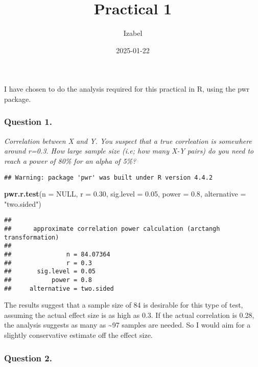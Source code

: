 \documentclass[
]{article}
\title{Practical 1}
\author{Izabel}
\date{2025-01-22}
\newenvironment{Shaded}{\begin{snugshade}}{\end{snugshade}}
\newcommand{\AttributeTok}[1]{\textcolor[rgb]{0.13,0.29,0.53}{#1}}
\newcommand{\ConstantTok}[1]{\textcolor[rgb]{0.56,0.35,0.01}{#1}}
\newcommand{\FloatTok}[1]{\textcolor[rgb]{0.00,0.00,0.81}{#1}}
\newcommand{\FunctionTok}[1]{\textcolor[rgb]{0.13,0.29,0.53}{\textbf{#1}}}
\newcommand{\NormalTok}[1]{#1}
\newcommand{\StringTok}[1]{\textcolor[rgb]{0.31,0.60,0.02}{#1}}
\begin{document}
\maketitle

I have chosen to do the analysis required for this practical in R, using
the pwr package.

\subsubsection{Question 1.}\label{question-1.}

\emph{Correlation between X and Y. You suspect that a true corrleation
is somewhere around r=0.3. How large sample size (i.e; how many X-Y
pairs) do you need to reach a power of 80\% for an alpha of 5\%?}

\begin{verbatim}
## Warning: package 'pwr' was built under R version 4.4.2
\end{verbatim}

\begin{Shaded}
\begin{Highlighting}[]
\FunctionTok{pwr.r.test}\NormalTok{(}\AttributeTok{n =} \ConstantTok{NULL}\NormalTok{, }\AttributeTok{r =} \FloatTok{0.30}\NormalTok{, }\AttributeTok{sig.level =} \FloatTok{0.05}\NormalTok{, }\AttributeTok{power =} \FloatTok{0.8}\NormalTok{, }\AttributeTok{alternative =} \StringTok{"two.sided"}\NormalTok{)}
\end{Highlighting}
\end{Shaded}

\begin{verbatim}
## 
##      approximate correlation power calculation (arctangh transformation) 
## 
##               n = 84.07364
##               r = 0.3
##       sig.level = 0.05
##           power = 0.8
##     alternative = two.sided
\end{verbatim}

The results suggest that a sample size of 84 is desirable for this type
of test, assuming the actual effect size is as high as 0.3. If the
actual correlation is 0.28, the analysis suggests as many as
\textasciitilde97 samples are needed. So I would aim for a slightly
conservative estimate off the effect size.

\subsubsection{Question 2.}\label{question-2.}
\end{document}
